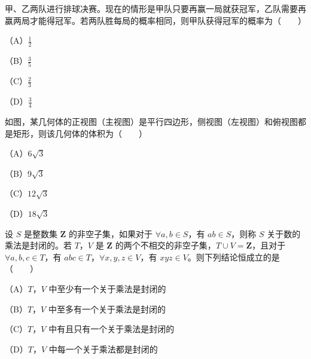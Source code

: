 \begin{question}
甲、乙两队进行排球决赛。现在的情形是甲队只要再赢一局就获冠军，乙队需要再赢两局才能得冠军。若两队胜每局的概率相同，则甲队获得冠军的概率为\mbox{（　　）}

（A）$\frac12$

（B）$\frac35$

（C）$\frac23$

（D）$\frac34$

\Needspace{0.4\textheight}
\end{question}
\begin{question}
如图，某几何体的正视图（主视图）是平行四边形，侧视图（左视图）和俯视图都是矩形，则该几何体的体积为\mbox{（　　）}

（A）$6\sqrt3$

（B）$9\sqrt3$

（C）$12\sqrt3$

（D）$18\sqrt3$
\nopagebreak[4]
\begin{center}\end{center}
\nopagebreak[4]
\end{question}
\begin{question}
设 $S$ 是整数集 $\mathbf Z$ 的非空子集，如果对于 $\forall a,b\in S$，有 $ab\in S$，则称 $S$ 关于数的乘法是封闭的。若 $T$，$V$ 是 $\mathbf Z$ 的两个不相交的非空子集，$T\cup V=\mathbf Z$，且对于 $\forall a,b,c\in T$，有 $abc\in T$，$\forall x,y,z\in V$，有 $xyz\in V$。则下列结论恒成立的是\mbox{（　　）}

（A）$T$，$V$ 中至少有一个关于乘法是封闭的

（B）$T$，$V$ 中至多有一个关于乘法是封闭的

（C）$T$，$V$ 中有且只有一个关于乘法是封闭的

（D）$T$，$V$ 中每一个关于乘法都是封闭的

\end{question}

